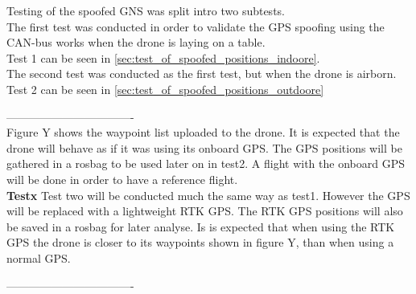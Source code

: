 Testing of the spoofed GNS was split intro two subtests. \\
The first test was conducted in order to validate the GPS spoofing using the CAN-bus works when the drone is laying on a table. \\
Test 1 can be seen in \ref{sec:test_of_spoofed_positions_indoore}.\\
The second test was conducted as the first test, but when the drone is airborn.\\
Test 2 can be seen in \ref{sec:test_of_spoofed_positions_outdoore}



----------------------------------\\
Figure Y shows the waypoint list uploaded to the drone. It is expected that the drone will behave as if it was using its onboard GPS.
The GPS positions will be gathered in a rosbag to be used later on in test2.
A flight with the onboard GPS will be done in order to have a reference flight.\\
\textbf{Testx}
Test two will be conducted much the same way as test1. However the GPS will be replaced with a lightweight RTK GPS. The RTK GPS positions will also be saved in a rosbag for later analyse. Is is expected that when using the RTK GPS the drone is closer to its waypoints  shown in figure Y, than when using a normal GPS.

----------------------------------\\





